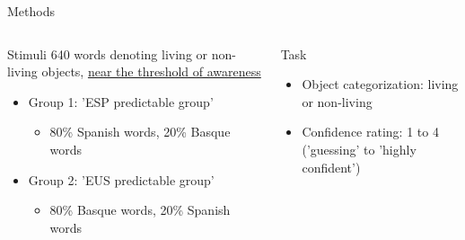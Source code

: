 \documentclass[final,12pt]{beamer}
\begin{document}
\begin{frame}[t]
\begin{columns}[t]
\begin{column}{\halfpagecol}
\begin{block}{Methods}
\begin{columns}

     \begin{column}{0.55\linewidth}
    \begin{greybox}{Stimuli}
    {\small 640 words denoting living or non-living objects, \underline{near the threshold of awareness}}
    \begin{itemize}
        \item {\small Group 1: 'ESP predictable group'}
        \begin{itemize}
            \item {\small 80\% Spanish words,} {\tiny 20\% Basque words}
        \end{itemize}
        \item {\small Group 2: 'EUS predictable group'}
        \begin{itemize}
            \item {\small 80\% Basque words,} {\tiny 20\% Spanish words}
        \end{itemize}
        \end{itemize}
    \end{greybox}
    \end{column}


        \begin{column}{0.43\linewidth}
        \begin{greybox}{Task}
        \begin{itemize}
        \item Object categorization: {\small living or non-living}
         \item Confidence rating: {\small 1 to 4 ('guessing' to 'highly confident')}
        \end{itemize}
    \end{greybox}
    
    \end{column}


      
      
      \end{columns}
      
     \end{block}
 


\end{column}
\end{columns}
\end{frame}
\end{document}
